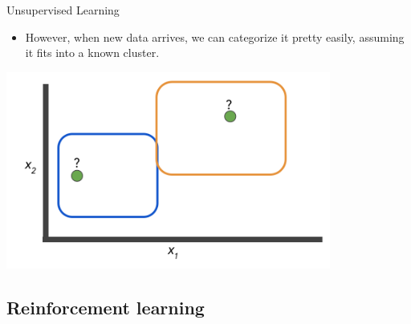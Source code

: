 \documentclass{beamer}
\begin{document}
\begin{frame}{Unsupervised Learning}

\begin{itemize}
\item However, when new data arrives, we can categorize it pretty easily, assuming it fits into a known cluster. 

\end{itemize}

\includegraphics[width=0.8\textwidth]{images/Graph7.png}

\end{frame}










\subsection{Reinforcement learning}
\end{document}
